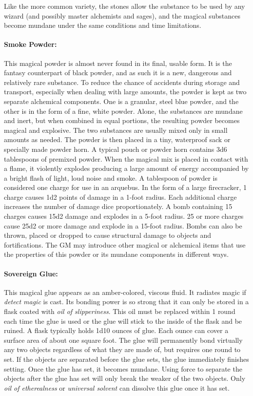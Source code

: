 \begin{multicols}{2}
Like the more common variety, the stones allow the substance to be used by any wizard (and possibly master alchemists and sages), and the magical substances become mundane under the same conditions and time limitations.

\paragraph{Smoke Powder:} This magical powder is almost never found in its final, usable form.  It is the fantasy counterpart of black powder, and as such it is a new, dangerous and relatively rare substance.  To reduce the chance of accidents during storage and transport, especially when dealing with large amounts, the powder is kept as two separate alchemical components.  One is a granular, steel blue powder, and the other is in the form of a fine, white powder.  Alone, the substances are mundane and inert, but when combined in equal portions, the resulting powder becomes magical and explosive.  The two substances are usually mixed only in small amounts as needed.  The powder is then placed in a tiny, waterproof sack or specially made powder horn.  A typical pouch or powder horn contains 3d6 tablespoons of premixed powder.  When the magical mix is placed in contact with a flame, it violently explodes producing a large amount of energy accompanied by a bright flash of light, loud noise and smoke.  A tablespoon of powder is considered one charge for use in an arquebus.  In the form of a large firecracker, 1 charge causes 1d2 points of damage in a 1-foot radius.  Each additional charge increases the number of damage dice proportionately.  A bomb containing 15 charges causes 15d2 damage and explodes in a 5-foot radius.  25 or more charges cause 25d2 or more damage and explode in a 15-foot radius.  Bombs can also be thrown, placed or dropped to cause structural damage to objects and fortifications.  The GM may introduce other magical or alchemical items that use the properties of this powder or its mundane components in different ways.

\paragraph{Sovereign Glue:} This magical glue appears as an amber-colored, viscous fluid.  It radiates magic if \textit{detect magic} is cast.  Its bonding power is so strong that it can only be stored in a flask coated with \textit{oil of slipperiness}.  This oil must be replaced within 1 round each time the glue is used or the glue will stick to the inside of the flask and be ruined.  A flask typically holds 1d10 ounces of glue.  Each ounce can cover a surface area of about one square foot.  The glue will permanently bond virtually any two objects regardless of what they are made of, but requires one round to set.  If the objects are separated before the glue sets, the glue immediately finishes setting.  Once the glue has set, it becomes mundane.  Using force to separate the objects after the glue has set will only break the weaker of the two objects.  Only \textit{oil of etherealness} or \textit{universal solvent} can dissolve this glue once it has set.


\end{multicols}
